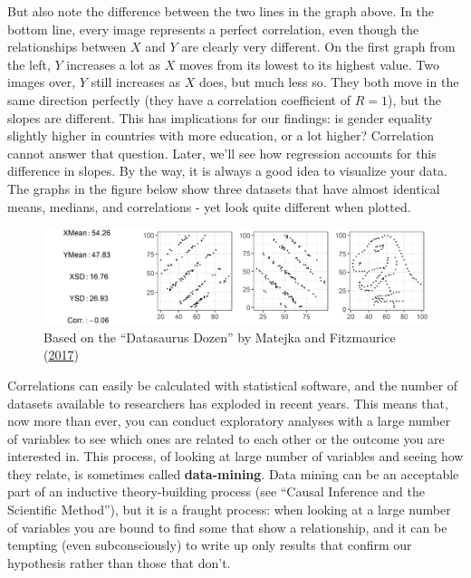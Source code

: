 \documentclass{book}
\begin{document}
But also note the difference between the two lines in the graph above. In the
bottom line, every image represents a perfect correlation, even though the
relationships between \(X\) and \(Y\) are clearly very different. On the first
graph from the left, \(Y\) increases a lot as \(X\) moves from its lowest to
its highest value. Two images over, \(Y\) still increases as \(X\) does, but
much less so. They both move in the same direction perfectly (they have a
correlation coefficient of \(R=1\)), but the slopes are different. This has
implications for our findings: is gender equality slightly higher in countries
with more education, or a lot higher? Correlation cannot answer that question.
Later, we'll see how regression accounts for this difference in slopes. By the
way, it is always a good idea to visualize your data. The graphs in the figure
below show three datasets that have almost identical means, medians, and
correlations - yet look quite different when plotted.

\begin{figure}
\centering
\includegraphics{images/largen/dino.png}
\caption{Based on the ``Datasaurus Dozen'' by Matejka and Fitzmaurice
(\protect\hyperlink{ref-matejkaSameStatsDifferent2017}{2017})}
\end{figure}

Correlations can easily be calculated with statistical software, and the
number of datasets available to researchers has exploded in recent years. This
means that, now more than ever, you can conduct exploratory analyses with a
large number of variables to see which ones are related to each other or the
outcome you are interested in. This process, of looking at large number of
variables and seeing how they relate, is sometimes called
\textbf{data-mining}. Data mining can be an acceptable part of an inductive
theory-building process (see ``Causal Inference and the Scientific Method''),
but it is a fraught process: when looking at a large number of variables you
are bound to find some that show a relationship, and it can be tempting (even
subconsciously) to write up only results that confirm our hypothesis rather
than those that don't.
\end{document}
